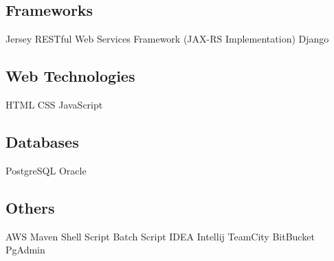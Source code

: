 \documentclass[]{deedy-resume-openfont}
\begin{document}
\begin{minipage}[t]{0.33\textwidth}
\subsection{Frameworks}
Jersey RESTful Web Services Framework (JAX-RS Implementation)\textbullet{} Django
\sectionsep
\subsection{Web Technologies}
HTML \textbullet{} CSS \textbullet{} JavaScript
\sectionsep
\subsection{Databases}
PostgreSQL \textbullet{} Oracle \textbullet{}
\sectionsep
\subsection{Others}
AWS \textbullet{} Maven \textbullet{} Shell Script \textbullet{} Batch Script \textbullet{} IDEA Intellij \textbullet{} TeamCity\textbullet{} BitBucket \textbullet{} PgAdmin

%
%

\end{minipage} 
\hfill
\end{document}
